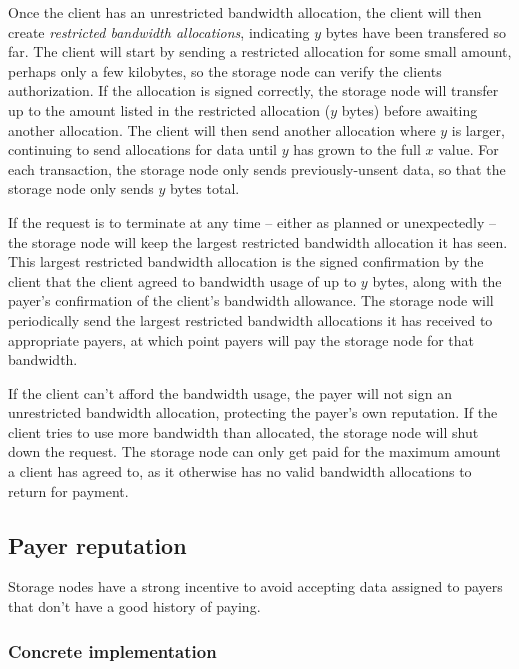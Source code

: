 \documentclass[a4paper,10pt]{article} \usepackage[utf8]{inputenc}
\begin{document}

Once the client has an unrestricted bandwidth allocation, the client will then
create {\em restricted bandwidth allocations}, 
indicating $y$ bytes have been transfered so far. The client
will start by sending a restricted allocation for some small amount, 
perhaps only a few kilobytes, 
so the storage node can verify the clients authorization.
If the allocation is signed correctly, the storage node will
transfer up to the amount listed in the restricted allocation ($y$ bytes) before
awaiting another allocation. The client will then send another allocation where
$y$ is larger, continuing to send allocations for data until $y$ has grown to
the full $x$ value. 
For each transaction, the storage node only sends previously-unsent data,
so that the storage node only sends $y$ bytes total.

If the request is to terminate at any time -- 
either as planned or unexpectedly --
the storage node will keep the largest restricted bandwidth allocation it has 
seen.
This largest restricted bandwidth allocation is the signed confirmation
by the client that the client agreed to bandwidth usage of up to $y$
bytes, along with the payer's confirmation of the client's bandwidth allowance.
The storage node will periodically send the largest restricted bandwidth
allocations it has received to appropriate payers, at which point
payers will pay the storage node for that bandwidth.

If the client can't afford the bandwidth usage, the payer will not sign an
unrestricted bandwidth allocation, protecting the payer's own reputation. 
If the client tries to use more bandwidth than allocated, 
the storage node will shut down the request. 
The storage node can only get paid for the maximum amount a client has agreed 
to, 
as it otherwise has no valid bandwidth allocations to return for
payment.

\subsection{Payer reputation}

Storage nodes have a strong incentive to avoid accepting data assigned to payers
that don't have a good history of paying.

\subsubsection{Concrete implementation}
\end{document}
